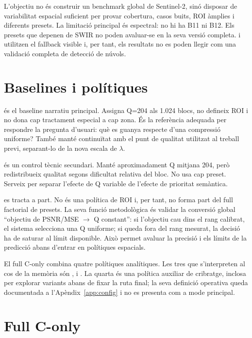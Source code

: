 L'objectiu no és construir un benchmark global de Sentinel-2, sinó disposar de
variabilitat espacial suficient per provar cobertura, casos buits, ROI àmplies i
diferents presets. La limitació principal és espectral: no hi ha B11 ni B12. Els
presets que depenen de SWIR no poden avaluar-se en la seva versió completa.
 i  utilitzen el fallback visible i, per tant,
els resultats no es poden llegir com una validació completa de detecció de
núvols.

\section{Baselines i polítiques}\label{sec:baselines}

 és el baseline narratiu principal. Assigna Q=204 als 1.024 blocs,
no defineix ROI i no dona cap tractament especial a cap zona. És la referència
adequada per respondre la pregunta d'usuari: què es guanya respecte d'una
compressió uniforme? També manté continuïtat amb el punt de qualitat utilitzat
al treball previ, separant-lo de la nova escala de $\lambda$.

 és un control tècnic secundari. Manté aproximadament Q
mitjana 204, però redistribueix qualitat segons dificultat relativa del bloc. No
usa cap preset. Serveix per separar l'efecte de Q variable de l'efecte de
prioritat semàntica.

 es tracta a part. No és una política de ROI i, per tant,
no forma part del full factorial de presets. La seva funció metodològica és
validar la conversió global ``objectiu de PSNR/MSE $\rightarrow$ Q constant'':
si l'objectiu cau dins el rang calibrat, el sistema selecciona una Q uniforme;
si queda fora del rang mesurat, la decisió ha de saturar al límit disponible.
Això permet avaluar la precisió i els límits de la predicció abans d'entrar en
polítiques espacials.

El full C-only combina quatre polítiques analítiques. Les tres que s'interpreten
al cos de la memòria són ,  i
. La quarta és una política auxiliar de cribratge, inclosa
per explorar variants abans de fixar la ruta final; la seva definició operativa
queda documentada a l'Apèndix~\ref{app:config} i no es presenta com a mode
principal.

\section{Full C-only}\label{sec:full_c}

